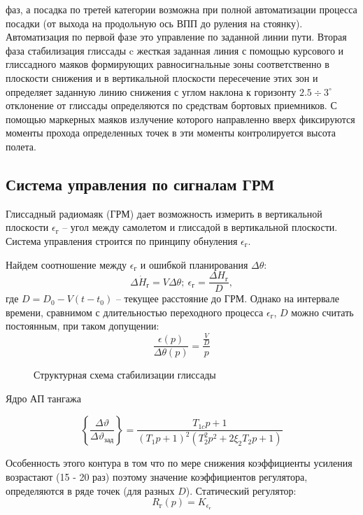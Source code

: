 \documentclass{article}
\begin{document}
фаз, а посадка по третей категории возможна при полной автоматизации процесса
посадки (от выхода на продольную ось ВПП до руления на стоянку).
Автоматизация по первой фазе это управление по заданной линии пути. Вторая фаза
стабилизация глиссады c жесткая заданная линия с помощью курсового и
глиссадного маяков формирующих равносигнальные зоны соответственно в плоскости
снижения и в вертикальной плоскости пересечение этих зон и определяет заданную
линию снижения с углом наклона к горизонту $2.5 \div 3^\circ$ отклонение от
глиссады определяются по средствам бортовых приемников.
С помощью маркерных маяков излучение которого направленно вверх фиксируются
моменты прохода определенных точек в эти моменты контролируется высота полета.
\begin{figure}[H]
	\centering
	\label{fig:fig_66}
\end{figure}

\subsection{Система управления по сигналам ГРМ}
Глиссадный радиомаяк (ГРМ) дает возможность измерить в вертикальной плоскости
$\epsilon_\text{г}$  -- угол между самолетом и глиссадой в вертикальной
плоскости. Система управления строится по принципу обнуления
$\epsilon_\text{г}$.
\begin{figure}[H]
	\centering
	\label{fig:fig_67}
\end{figure}

Найдем соотношение между $\epsilon_\text{г}$ и ошибкой планирования $\Delta
	\theta$:
\[
	\Delta \dot{H}_{\text{г}} = V \Delta \theta; \ \epsilon_\text{г} =
	\frac{\Delta H_\text{г}}{D},
\]
где $D = D_0 - V(t-t_0)$ -- текущее расстояние до ГРМ.
Однако на интервале времени, сравнимом с длительностью переходного процесса
$\epsilon_\text{г}$, $D$ можно считать постоянным, при таком допущении:
\[
	\frac{\epsilon(p)}{\Delta \theta(p)} = \frac{\frac{V}{D}}{p}
\]

\begin{figure}[H]
	\centering
	\caption{Структурная схема стабилизации глиссады}
	\label{fig:fig_68}
\end{figure}
Ядро АП тангажа

\[
	\left\{ \frac{\Delta \vartheta}{\Delta \vartheta_\text{зад}} \right\}  =
	\frac{T_{1c}p + 1}{(T_{1}p + 1)^2 ( T_2^2p^2 + 2 \xi_2 T_2 p + 1 )}
\]


Особенность этого контура в том что по мере снижения коэффициенты усиления
возрастают (15 - 20 раз) поэтому значение коэффициентов регулятора,
определяются в ряде точек (для разных $D$).
Статический регулятор:
\[
	R_\text{г}(p) = K_{\epsilon_\text{г}}
\]
\end{document}
